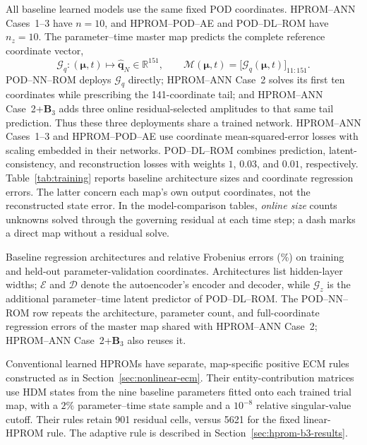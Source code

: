 \documentclass[11pt]{article}
\newcommand{\q}{\mathbf q}
\newcommand{\mub}{\bm\mu}
\newcommand{\papertable}[1]{%
  \begingroup
  \small
  \setlength{\tabcolsep}{3.5pt}%
  \renewcommand{\arraystretch}{1.15}%
  \begin{adjustbox}{max width=\textwidth}
  
  \end{adjustbox}%
  \endgroup
}
\begin{document}
All baseline learned models use the same fixed POD coordinates.
HPROM--ANN Cases~1--3 have $n=10$, and HPROM--POD--AE and POD--DL--ROM have
$n_z=10$.  The parameter--time master map predicts the complete reference
coordinate vector,
\begin{equation}
\mathcal G_q:(\mub,t)\longmapsto\widehat{\q}_N\in\mathbb R^{151},\qquad
\mathcal M(\mub,t)=\bigl[\mathcal G_q(\mub,t)\bigr]_{11:151}.
\label{eq:master-map}
\end{equation}
POD--NN--ROM deploys $\mathcal G_q$ directly; HPROM--ANN Case~2 solves its
first ten coordinates while prescribing the 141-coordinate tail; and
HPROM--ANN Case~2+$\mathbf B_3$ adds three online residual-selected
amplitudes to that same tail prediction.  Thus these three deployments
share a trained network.
HPROM--ANN Cases~1--3 and HPROM--POD--AE use coordinate mean-squared-error
losses with scaling embedded in their networks.  POD--DL--ROM combines
prediction, latent-consistency, and reconstruction losses with weights
$1$, $0.03$, and $0.01$, respectively.
Table~\ref{tab:training} reports baseline architecture sizes and coordinate
regression errors.  The latter concern each map's own output coordinates,
not the reconstructed state error.
In the model-comparison tables, \emph{online size} counts unknowns solved
through the governing residual at each time step; a dash marks a direct
map without a residual solve.
\begin{table}[H]
\centering
\caption{Baseline regression architectures and relative Frobenius errors
(\%) on training and held-out parameter-validation coordinates.
Architectures list hidden-layer widths;
$\mathcal E$ and $\mathcal D$
denote the autoencoder's encoder and decoder, while $\mathcal G_z$ is
the additional parameter--time latent predictor of POD--DL--ROM.
The POD--NN--ROM row repeats the architecture, parameter count, and
full-coordinate regression errors of the master map shared with HPROM--ANN
Case~2; HPROM--ANN Case~2+$\mathbf B_3$ also reuses it.}
\label{tab:training}
\papertable{tables/euclidean_hprom/training_baseline.tex}
\end{table}

Conventional learned HPROMs have separate, map-specific positive ECM rules
constructed as in Section~\ref{sec:nonlinear-ecm}.  Their entity-contribution
matrices use HDM states from the nine baseline parameters fitted onto each
trained trial map, with a $2\%$ parameter--time state sample and a
$10^{-8}$ relative singular-value cutoff.  Their rules retain 901 residual
cells, versus 5621 for the fixed linear-HPROM rule.  The adaptive rule is
described in Section~\ref{sec:hprom-b3-results}.
\end{document}
